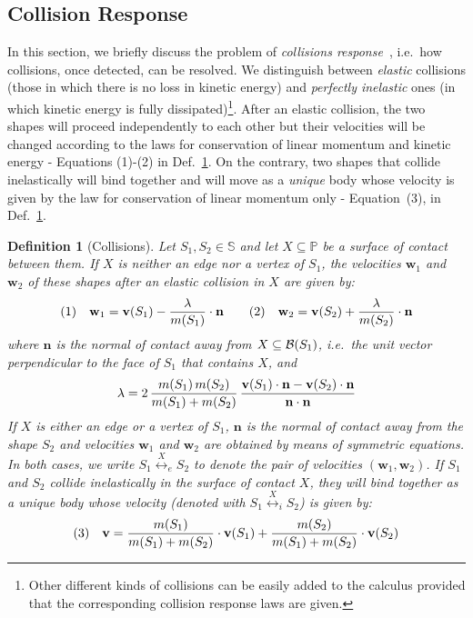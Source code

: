 \documentclass[11pt]{article}
\newcommand{\shapes}{\mathbb{S}}
\newcommand{\vect}[1]{\mathbf{#1}}
\newcommand{\pos}{{\mathbb P}}
\newcommand{\collision}[2]{\stackrel{{#1}}{\longleftrightarrow}_{#2}}
\newcommand{\boundary}[1]{\ensuremath{{\cal B}(#1)}}
\newcommand{\velocity}[1]{{\bf v}(#1)}
\newcommand{\mass}[1]{m(#1)}
\newtheorem{definition}{Definition}
\begin{document}
\subsection{Collision Response} \label{sec:collisionresponse}

In this section, we briefly discuss the problem of {\em collisions response}~\cite{Hecker1997},
i.e.\ how collisions, once detected, can be resolved. We distinguish between {\em elastic} collisions (those in which there is no loss in kinetic energy) and {\em perfectly inelastic} ones (in which kinetic energy is fully dissipated)\footnote{Other different kinds of collisions can be easily added to the calculus provided that the corresponding collision response laws are given.}. After an elastic collision, the two shapes will proceed independently to each other but their velocities will be changed according to the laws for conservation of linear momentum and kinetic energy - Equations (1)-(2) in Def.~\ref{def:collisions}. On the contrary, two shapes that collide inelastically will bind together and will move as a {\em unique} body whose velocity is given by the law for conservation of linear momentum only - Equation~(3), in Def.~\ref{def:collisions}.

\begin{definition}[Collisions]
\label{def:collisions}
Let $S_1, S_2\in \shapes$ and let $X \subseteq \pos$ be a surface of contact between them. If $X$ is neither an edge nor a vertex of $S_1$, the velocities $\vect{w}_1$ and $\vect{w}_2$ of these shapes after an elastic collision in $X$ are given by:
$$
\begin{array}{c c c c }
(1) & \vect{w}_1 = \velocity{S_1}  - \dfrac{\lambda}{\mass{S_1}} \cdot \vect{n}
\quad  &
(2) & \vect{w}_2 = \velocity{S_2}  +  \dfrac{\lambda}{\mass{S_2}} \cdot \vect{n} \\
\end{array}
$$
\noindent where $\vect{n}$ is the normal of contact away from $X \subseteq \boundary{S_1}$, i.e.\
the unit vector perpendicular to the face of $S_1$ that contains $X$, and$$\lambda = 2 \, \dfrac{\mass{S_1} \, \mass{S_2}}{\mass{S_1} + \mass{S_2}}
\, \dfrac{\velocity{S_1} \cdot \vect{n} - \velocity{S_2} \cdot \vect{n}} {\vect{n} \cdot
\vect{n}}$$
If $X$ is either an edge or a vertex of $S_1$, $\vect{n}$ is the normal of contact away from the
shape $S_2$ and velocities $\vect{w}_1$ and $\vect{w}_2$ are obtained by means of
symmetric equations. In both cases, we write $S_1 \collision{X}{\mathit{e}} S_2$ to denote the pair
of velocities $(\vect{w}_1, \vect{w}_2)$. If $S_1$ and $S_2$ collide inelastically in the surface of
contact $X$, they will bind together as a unique body whose velocity (denoted with
$S_1 \collision{X}{\mathit{i}} S_2$) is given by:
$$\begin{array}{c c}
(3) & \vect{v} = \dfrac{\mass{S_1}}{\mass{S_1} + \mass{S_2}} \cdot
\velocity{S_1} +
\dfrac{\mass{S_2}}{\mass{S_1} + \mass{S_2}} \cdot \velocity{S_2}\\
\end{array}$$
\end{definition}
\end{document}

